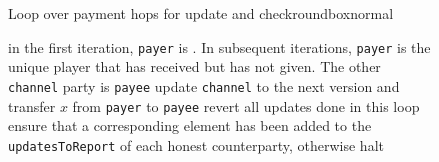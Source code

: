   \begin{figure}[H]
    \begin{titlebox}{\normalfont Loop over payment hops for update and
    check}{roundbox}{normal}
      \begin{algorithmic}[1]
        \label{alg:fpaynet:resolvepay:loops:update:loop}
          \State in the first iteration, \texttt{payer} is \dave. In
          subsequent iterations, \texttt{payer} is the unique player that
          has received but has not given. The other \texttt{channel} party
          is \texttt{payee}
            \State update \texttt{channel} to the next version and
            transfer $x$ from \texttt{payer} to \texttt{payee}
            \label{alg:fpaynet:resolvepay:loops:update:do}
          \Else
            \State revert all updates done in this loop
          \EndIf
        \EndFor
        \label{alg:fpaynet:resolvepay:loops:halt:loop}
          \State ensure that a corresponding element has been added to
          the \texttt{updatesToReport} of each honest counterparty,
          otherwise halt
          \label{alg:fpaynet:resolvepay:loops:halt:do}
        \EndFor
      \end{algorithmic}
    \end{titlebox}
    \caption{}
    \label{alg:fpaynet:resolvepay:loops}
  \end{figure}

